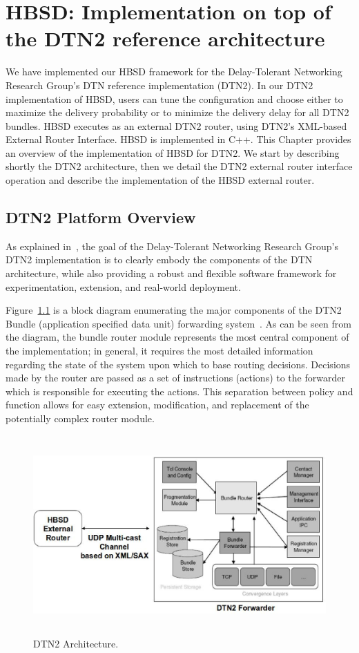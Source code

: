 \chapter{HBSD: Implementation on top of the DTN2 reference architecture}
\label{chapter:HBSD}
\minitoc

We have implemented our HBSD framework for the Delay-Tolerant Networking Research Group's DTN reference implementation (DTN2). 
In our DTN2 implementation of HBSD, users can tune the configuration and choose either to maximize the
delivery probability or to minimize the delivery delay for all DTN2 bundles. HBSD executes as an external DTN2 router, using DTN2's XML-based External Router Interface. HBSD is implemented in C++. This Chapter provides an overview of the implementation of HBSD for DTN2. We start by describing shortly the DTN2 architecture, then we detail the DTN2 external router interface operation and describe the implementation of the HBSD external router.

\section{DTN2 Platform Overview}
\label{DTN2}

As explained in~\cite{DTN2Manual}, the goal of the Delay-Tolerant Networking Research Group's DTN2 implementation is to clearly embody the components of the DTN architecture, while also providing a robust and flexible software framework for experimentation, extension, and real-world deployment.

Figure~\ref{DTN2-Arch} is a block diagram enumerating the major components of the DTN2 Bundle (application specified data 
unit) forwarding system~\cite{Demmer03implementingdelay}. As can be seen from the diagram, the bundle router module represents the most central component of the implementation; in general, it requires the most detailed information regarding the state of the system upon which to base routing decisions. Decisions made by the router are passed as a set of instructions (actions) to the forwarder which is responsible for executing the actions. This separation between policy and function allows for easy extension, modification, and replacement of the potentially complex router module. 

\begin{figure}[!h]
\centering
\includegraphics[width=5in,height=3in]{Chapitre4/HBSD-DTN2.eps}
\caption{DTN2 Architecture.}
\label{DTN2-Arch}
\end{figure}

